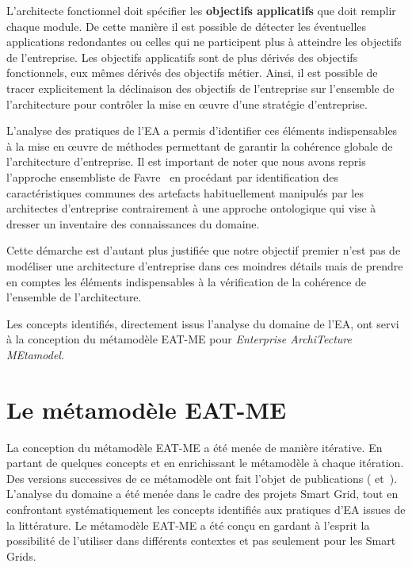     L'architecte fonctionnel doit spécifier les \textbf{objectifs applicatifs} que doit remplir chaque module. De
    cette manière il est possible de détecter les éventuelles applications redondantes ou celles qui
    ne participent plus à atteindre les objectifs de l'entreprise. Les objectifs applicatifs sont de plus dérivés
    des objectifs fonctionnels, eux mêmes dérivés des objectifs métier. Ainsi, il est possible de tracer
    explicitement la déclinaison des objectifs de l'entreprise sur l'ensemble de l'architecture pour contrôler
    la mise en œuvre d'une stratégie d'entreprise.

    L'analyse des pratiques de l'EA a permis d'identifier ces éléments indispensables à la mise en œuvre
    de méthodes permettant de garantir la cohérence globale de l'architecture d'entreprise. Il est important
    de noter que nous avons repris l'approche ensembliste de Favre~\cite{favre2005foundations} en procédant
    par identification des caractéristiques communes des artefacts habituellement manipulés par
    les architectes d'entreprise contrairement à une approche ontologique qui vise à dresser un inventaire des
    connaissances du domaine.

    Cette démarche est d'autant plus justifiée que notre objectif premier n'est pas de modéliser une architecture
    d'entreprise dans ces moindres détails mais de prendre en comptes les éléments indispensables à
    la vérification de la cohérence de l'ensemble de l'architecture.

    Les concepts identifiés, directement issus l'analyse du domaine de l'EA, ont servi à la conception du
    métamodèle EAT-ME pour \emph{Enterprise ArchiTecture MEtamodel}.

\section{Le métamodèle EAT-ME}
\label{sec:EAT-ME}
    La conception du métamodèle EAT-ME a été menée de manière itérative. En partant de quelques concepts
    et en enrichissant le métamodèle à chaque itération. Des versions successives de ce métamodèle
    ont fait l'objet de publications (\cite{seghiri2015simulation} et~\cite{seghiri2016executable}).
    L'analyse du domaine a été menée dans le cadre des projets Smart Grid, tout en confrontant systématiquement
    les concepts identifiés aux pratiques d'EA issues de la littérature. Le métamodèle EAT-ME a été conçu en gardant
    à l'esprit la possibilité de l'utiliser dans différents contextes et pas seulement pour les Smart Grids.

